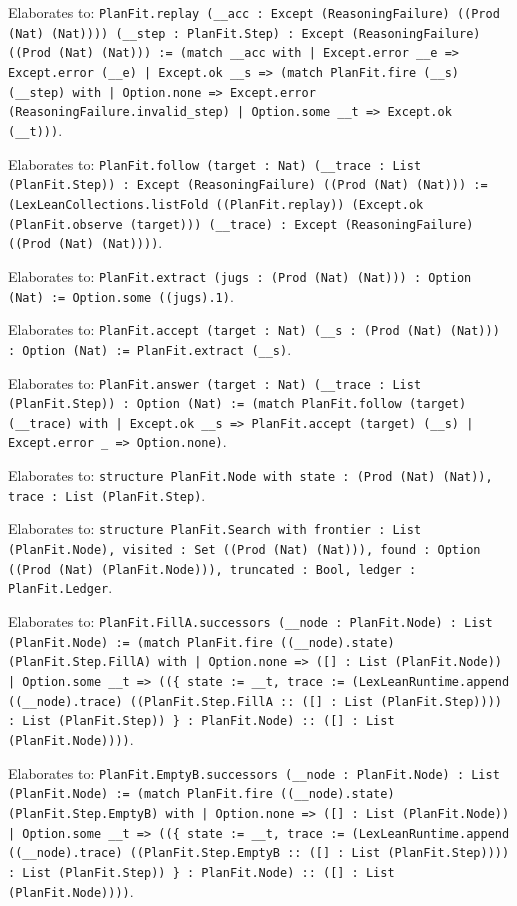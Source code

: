 \documentclass[11pt]{article}
\begin{document}
\noindent Elaborates to: \texttt{PlanFit.replay (\_\_acc : Except (ReasoningFailure) ((Prod (Nat) (Nat)))) (\_\_step : PlanFit.Step) : Except (ReasoningFailure) ((Prod (Nat) (Nat))) := (match \_\_acc with | Except.error \_\_e => Except.error (\_\_e) | Except.ok \_\_s => (match PlanFit.fire (\_\_s) (\_\_step) with | Option.none => Except.error (ReasoningFailure.invalid\_step) | Option.some \_\_t => Except.ok (\_\_t)))}.\par
\noindent Elaborates to: \texttt{PlanFit.follow (target : Nat) (\_\_trace : List (PlanFit.Step)) : Except (ReasoningFailure) ((Prod (Nat) (Nat))) := (LexLeanCollections.listFold ((PlanFit.replay)) (Except.ok (PlanFit.observe (target))) (\_\_trace) : Except (ReasoningFailure) ((Prod (Nat) (Nat))))}.\par
\noindent Elaborates to: \texttt{PlanFit.extract (jugs : (Prod (Nat) (Nat))) : Option (Nat) := Option.some ((jugs).1)}.\par
\noindent Elaborates to: \texttt{PlanFit.accept (target : Nat) (\_\_s : (Prod (Nat) (Nat))) : Option (Nat) := PlanFit.extract (\_\_s)}.\par
\noindent Elaborates to: \texttt{PlanFit.answer (target : Nat) (\_\_trace : List (PlanFit.Step)) : Option (Nat) := (match PlanFit.follow (target) (\_\_trace) with | Except.ok \_\_s => PlanFit.accept (target) (\_\_s) | Except.error \_ => Option.none)}.\par
\noindent Elaborates to: \texttt{structure PlanFit.Node with state : (Prod (Nat) (Nat)), trace : List (PlanFit.Step)}.\par
\noindent Elaborates to: \texttt{structure PlanFit.Search with frontier : List (PlanFit.Node), visited : Set ((Prod (Nat) (Nat))), found : Option ((Prod (Nat) (PlanFit.Node))), truncated : Bool, ledger : PlanFit.Ledger}.\par
\noindent Elaborates to: \texttt{PlanFit.FillA.successors (\_\_node : PlanFit.Node) : List (PlanFit.Node) := (match PlanFit.fire ((\_\_node).state) (PlanFit.Step.FillA) with | Option.none => ([] : List (PlanFit.Node)) | Option.some \_\_t => ((\{ state := \_\_t, trace := (LexLeanRuntime.append ((\_\_node).trace) ((PlanFit.Step.FillA :: ([] : List (PlanFit.Step)))) : List (PlanFit.Step)) \} : PlanFit.Node) :: ([] : List (PlanFit.Node))))}.\par
\noindent Elaborates to: \texttt{PlanFit.EmptyB.successors (\_\_node : PlanFit.Node) : List (PlanFit.Node) := (match PlanFit.fire ((\_\_node).state) (PlanFit.Step.EmptyB) with | Option.none => ([] : List (PlanFit.Node)) | Option.some \_\_t => ((\{ state := \_\_t, trace := (LexLeanRuntime.append ((\_\_node).trace) ((PlanFit.Step.EmptyB :: ([] : List (PlanFit.Step)))) : List (PlanFit.Step)) \} : PlanFit.Node) :: ([] : List (PlanFit.Node))))}.\par
\end{document}
